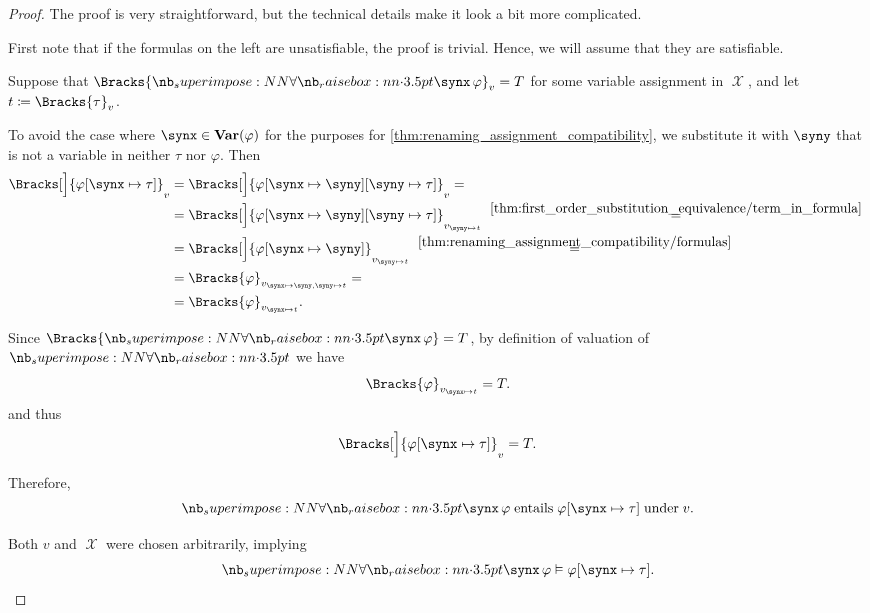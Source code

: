 \begin{proof}
  The proof is very straightforward, but the technical details make it look a bit more complicated.

  First note that if the formulas on the left are unsatisfiable, the proof is trivial. Hence, we will assume that they are satisfiable.

   Suppose that \( \Bracks{\qforall \synx \varphi}_v = T \) for some variable assignment in \( \mscrX \), and let \( t \coloneqq \Bracks{\tau}_v \).

  To avoid the case where \( \synx \in \op*{Var}(\varphi) \) for the purposes for \cref{thm:renaming_assignment_compatibility}, we substitute it with \( \syny \) that is not a variable in neither \( \tau \) nor \( \varphi \). Then
  \begin{align*}
    \Bracks[\Big]{\varphi[\synx \mapsto \tau]}_v
    &=
    \Bracks[\Big]{\varphi[\synx \mapsto \syny][\syny \mapsto \tau]}_v
    = \\ &=
    \Bracks[\Big]{\varphi[\synx \mapsto \syny][\syny \mapsto \tau]}_{v_{\syny \mapsto t}}
    \reloset {\ref{thm:first_order_substitution_equivalence/term_in_formula}} = \\ &=
    \Bracks[\Big]{\varphi[\synx \mapsto \syny]}_{v_{\syny \mapsto t}}
    \reloset {\ref{thm:renaming_assignment_compatibility/formulas}} = \\ &=
    \Bracks{\varphi}_{v_{\synx \mapsto \syny, \syny \mapsto t}}
    = \\ &=
    \Bracks{\varphi}_{v_{\synx \mapsto t}}.
  \end{align*}

  Since \( \Bracks{\qforall \synx \varphi} = T \), by definition of valuation of \( \synforall \) we have
  \begin{equation*}
    \Bracks{\varphi}_{v_{\synx \mapsto t}} = T.
  \end{equation*}
  and thus
  \begin{equation*}
    \Bracks[\Big]{\varphi[\synx \mapsto \tau]}_v = T.
  \end{equation*}

  Therefore,
  \begin{equation*}
    \qforall \synx \varphi \T{entails} \varphi[\synx \mapsto \tau] \T{under} v.
  \end{equation*}

  Both \( v \) and \( \mscrX \) were chosen arbitrarily, implying
  \begin{equation*}
    \qforall \synx \varphi \vDash \varphi[\synx \mapsto \tau].
  \end{equation*}


\end{proof}
